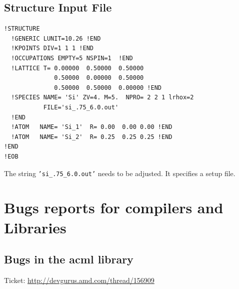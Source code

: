 \documentclass[a4paper,10pt]{report}
\newcommand{\mytt}[1]{{\tt #1}}
\begin{document}
\section{Structure Input File}
\begin{verbatim}
!STRUCTURE
  !GENERIC LUNIT=10.26 !END
  !KPOINTS DIV=1 1 1 !END
  !OCCUPATIONS EMPTY=5 NSPIN=1  !END
  !LATTICE T= 0.00000  0.50000  0.50000
              0.50000  0.00000  0.50000
              0.50000  0.50000  0.00000 !END
  !SPECIES NAME= 'Si' ZV=4. M=5.  NPRO= 2 2 1 lrhox=2
           FILE='si_.75_6.0.out'  
  !END
  !ATOM   NAME= 'Si_1'  R= 0.00  0.00 0.00 !END
  !ATOM   NAME= 'Si_2'  R= 0.25  0.25 0.25 !END
!END
!EOB
\end{verbatim}

The string \mytt{'si\_.75\_6.0.out'} needs to be adjusted. It specifies a setup file.

\newpage
\chapter{Bugs reports for compilers and Libraries}


\section{Bugs in the acml library}
Ticket: \url{http://devgurus.amd.com/thread/156909}
\end{document}
